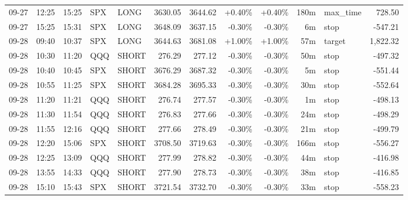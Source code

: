 \documentclass[11pt,a4paper]{article}
\begin{document}
\begin{center}
\begin{longtable}{>{\color{txtmain}}l l l l l r r r r r >{\color{txtmain}}l r}
09-27 & 12:25 & 15:25 & SPX & LONG & 3630.05 & 3644.62 & \textcolor{wingreen}{+0.40\%} & \textcolor{wingreen}{+0.40\%} & 180m & max\_time & \textcolor{wingreen}{728.50} \\
09-27 & 15:25 & 15:31 & SPX & LONG & 3648.09 & 3637.15 & \textcolor{lossred}{-0.30\%} & \textcolor{lossred}{-0.30\%} & 6m & stop & \textcolor{lossred}{-547.21} \\
09-28 & 09:40 & 10:37 & SPX & LONG & 3644.63 & 3681.08 & \textcolor{wingreen}{+1.00\%} & \textcolor{wingreen}{+1.00\%} & 57m & target & \textcolor{wingreen}{1,822.32} \\
09-28 & 10:30 & 11:20 & QQQ & SHORT & 276.29 & 277.12 & \textcolor{lossred}{-0.30\%} & \textcolor{lossred}{-0.30\%} & 50m & stop & \textcolor{lossred}{-497.32} \\
09-28 & 10:40 & 10:45 & SPX & SHORT & 3676.29 & 3687.32 & \textcolor{lossred}{-0.30\%} & \textcolor{lossred}{-0.30\%} & 5m & stop & \textcolor{lossred}{-551.44} \\
09-28 & 10:55 & 11:25 & SPX & SHORT & 3684.28 & 3695.33 & \textcolor{lossred}{-0.30\%} & \textcolor{lossred}{-0.30\%} & 30m & stop & \textcolor{lossred}{-552.64} \\
09-28 & 11:20 & 11:21 & QQQ & SHORT & 276.74 & 277.57 & \textcolor{lossred}{-0.30\%} & \textcolor{lossred}{-0.30\%} & 1m & stop & \textcolor{lossred}{-498.13} \\
09-28 & 11:30 & 11:54 & QQQ & SHORT & 276.83 & 277.66 & \textcolor{lossred}{-0.30\%} & \textcolor{lossred}{-0.30\%} & 24m & stop & \textcolor{lossred}{-498.29} \\
09-28 & 11:55 & 12:16 & QQQ & SHORT & 277.66 & 278.49 & \textcolor{lossred}{-0.30\%} & \textcolor{lossred}{-0.30\%} & 21m & stop & \textcolor{lossred}{-499.79} \\
09-28 & 12:20 & 15:06 & SPX & SHORT & 3708.50 & 3719.63 & \textcolor{lossred}{-0.30\%} & \textcolor{lossred}{-0.30\%} & 166m & stop & \textcolor{lossred}{-556.27} \\
09-28 & 12:25 & 13:09 & QQQ & SHORT & 277.99 & 278.82 & \textcolor{lossred}{-0.30\%} & \textcolor{lossred}{-0.30\%} & 44m & stop & \textcolor{lossred}{-416.98} \\
09-28 & 13:55 & 14:33 & QQQ & SHORT & 277.90 & 278.73 & \textcolor{lossred}{-0.30\%} & \textcolor{lossred}{-0.30\%} & 38m & stop & \textcolor{lossred}{-416.85} \\
09-28 & 15:10 & 15:43 & SPX & SHORT & 3721.54 & 3732.70 & \textcolor{lossred}{-0.30\%} & \textcolor{lossred}{-0.30\%} & 33m & stop & \textcolor{lossred}{-558.23} \\

\end{longtable}
\end{center}
\end{document}
